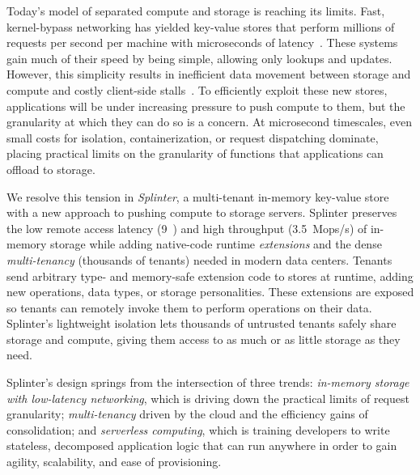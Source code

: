 Today's model of separated compute and storage is reaching its limits.  Fast,
  kernel-bypass networking has yielded key-value stores that perform
  millions of requests per second per machine with microseconds of
  latency~\cite{farm-2014,fasst-2016,mica,ramcloud,drtm}.
These systems gain much of their speed by being simple, allowing only lookups
  and updates.
However, this simplicity results in inefficient data movement between storage and
  compute and costly client-side stalls~\cite{killer-microseconds,grappa}.
To efficiently exploit these new stores, applications will be under
  increasing pressure to push compute to them, but the granularity at which
  they can do so is a concern.
At microsecond timescales, even small costs for isolation, containerization, or
  request dispatching dominate, placing practical limits on the granularity of
  functions that applications can offload to storage.

We resolve this tension in \textsl{Splinter}, a multi-tenant in-memory key-value store with
  a new approach to pushing compute to storage servers.
Splinter preserves the low remote access latency (9~\us) and high throughput (3.5~Mops/s)
  of in-memory storage
  while adding native-code runtime \textsl{extensions} and the dense
  \textsl{multi-tenancy} (thousands of tenants) needed in modern data centers.
Tenants send arbitrary type- and memory-safe extension code to
  stores at runtime, adding new operations, data types, or
  storage personalities.
These extensions are exposed so tenants can remotely
  invoke them to perform operations on
  their data.
Splinter's lightweight isolation lets thousands of untrusted tenants
  safely share storage and compute, giving them access to as
  much or as little storage as they need.

Splinter's design springs from the intersection of three trends:
  \textsl{in-memory storage with low-latency networking}, which is driving down
  the practical limits of request granularity;
\textsl{multi-tenancy} driven by the cloud and the efficiency gains of
  consolidation;
and \textsl{serverless computing}, which is training developers to
  write stateless, decomposed application logic that can run anywhere in order to gain agility,
  scalability, and ease of provisioning.

